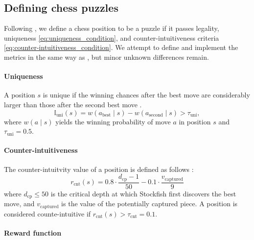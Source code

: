 \documentclass[letterpaper]{article} %
\begin{document}
\subsection{Defining chess puzzles}
Following \citeauthor{feng2025generatingcreativechesspuzzles}, we define a chess position to be a puzzle if it passes legality, uniqueness \eqref{eq:uniqueness_condition}, and counter-intuitiveness criteria \eqref{eq:counter-intuitiveness_condition}. We attempt to define and implement the metrics in the same way as \cite{feng2025generatingcreativechesspuzzles}, but minor unknown differences remain.

\paragraph{Uniqueness}
A position $s$ is unique if the winning chances after the best move are considerably larger than those after the second best move \cite{lichesspuzzler,feng2025generatingcreativechesspuzzles}.
\begin{equation}
    \mathbb{I}_{\text{uni}}(s) = w(a_{\text{best}} \mid s) - w(a_{\text{second}} \mid s) > \tau_{\text{uni}},
    \label{eq:uniqueness_condition}
\end{equation}
where $w(a \mid s)$ yields the winning probability of move $a$ in position $s$ \cite{Lichessaccuracymetric} and $\tau_{\text{uni}} = 0.5$.

\paragraph{Counter-intuitiveness}
The counter-intuitvity value of a position is defined as follows \cite{feng2025generatingcreativechesspuzzles}:
\begin{equation}
    r_{\text{cnt}}(s) = 0.8 \cdot \frac{d_{\text{cp}} - 1}{50} - 0.1 \cdot \frac{v_{\text{captured}}}{9}
    \label{eq:counter-intuitiveness_condition}
\end{equation}
where $d_{\text{cp}} \le 50$ is the critical depth at which Stockfish first discovers the best move, and $v_{\text{captured}}$ is the value of the potentially captured piece. A position is considered counte-intuitive if $r_{\text{cnt}}(s) > \tau_{\text{cnt}} = 0.1$.

\paragraph{Reward function}
\end{document}
